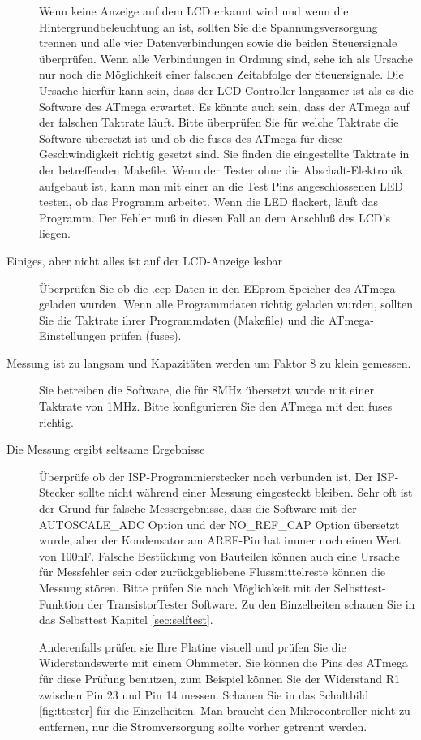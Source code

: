 \begin{description}
Wenn keine Anzeige auf dem LCD erkannt wird und wenn die Hintergrundbeleuchtung an ist,
sollten Sie die Spannungsversorgung trennen und alle vier Datenverbindungen sowie die 
beiden Steuersignale überprüfen.
Wenn alle Verbindungen in Ordnung sind, sehe ich als Ursache nur noch die Möglichkeit einer
falschen Zeitabfolge der Steuersignale.
Die Ursache hierfür kann sein, dass der LCD-Controller langsamer ist als es die Software
des ATmega erwartet. Es könnte auch sein, dass der ATmega auf der falschen Taktrate läuft.
Bitte überprüfen Sie für welche Taktrate die Software übersetzt ist und ob
die fuses des ATmega für diese Geschwindigkeit richtig gesetzt sind.
Sie finden die eingestellte Taktrate in der betreffenden Makefile.
Wenn der Tester ohne die Abschalt-Elektronik aufgebaut ist, kann man mit einer
an die Test Pins angeschlossenen LED testen, ob das Programm arbeitet.
Wenn die LED flackert, läuft das Programm. Der Fehler muß in diesen Fall an
dem Anschluß des LCD's liegen. 
\item[Einiges, aber nicht alles ist auf der LCD-Anzeige lesbar] 
Überprüfen Sie ob die .eep Daten in den EEprom Speicher des ATmega geladen wurden.
Wenn alle Programmdaten richtig geladen wurden, sollten Sie die Taktrate ihrer
Programmdaten (Makefile) und die ATmega-Einstellungen prüfen (fuses).

\item[Messung ist zu langsam und Kapazitäten werden um Faktor 8 zu klein gemessen.] 
Sie betreiben die Software, die für 8MHz übersetzt wurde mit einer Taktrate von 1MHz.
Bitte konfigurieren Sie den ATmega mit den fuses richtig.

\item[Die Messung ergibt seltsame Ergebnisse]  
Überprüfe ob der ISP-Programmierstecker noch verbunden ist.
Der ISP-Stecker sollte nicht während einer Messung eingesteckt bleiben.
Sehr oft ist der Grund für falsche Messergebnisse, dass die Software mit der
 AUTOSCALE\_ADC Option und der NO\_REF\_CAP Option übersetzt wurde, aber der
Kondensator am AREF-Pin hat immer noch einen Wert von 100nF.
Falsche Bestückung von Bauteilen können auch eine Ursache für Messfehler sein 
oder zurückgebliebene Flussmittelreste können die Messung stören.
Bitte prüfen Sie nach Möglichkeit mit der Selbsttest-Funktion der
TransistorTester Software.
Zu den Einzelheiten schauen Sie in das Selbsttest Kapitel \ref{sec:selftest}.

Anderenfalls prüfen sie Ihre Platine visuell und prüfen Sie die Widerstandswerte
mit einem Ohmmeter. Sie können die Pins des ATmega für diese Prüfung benutzen,
zum Beispiel können Sie der Widerstand R1 zwischen Pin 23 und Pin 14 messen.
Schauen Sie in das Schaltbild \ref{fig:ttester} für die Einzelheiten.
Man braucht den Mikrocontroller nicht zu entfernen, nur die Stromversorgung sollte
vorher getrennt werden.


\end{description}

